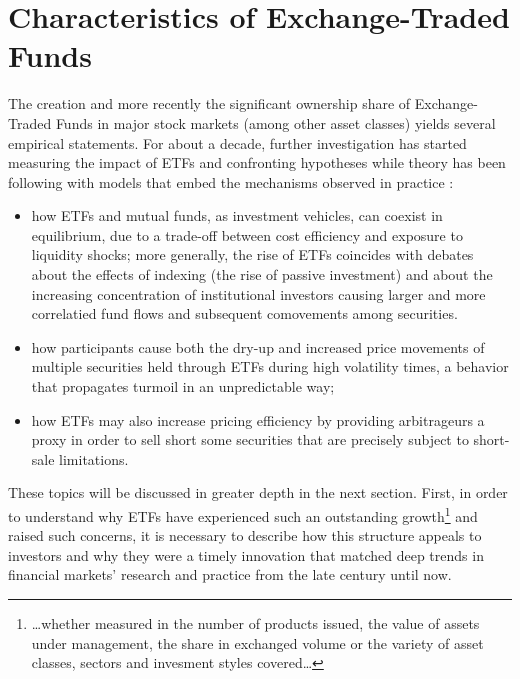 \section{Characteristics of Exchange-Traded Funds}
The creation and more recently the significant ownership share of Exchange-Traded Funds in major stock markets (among other asset classes) yields several empirical statements. For about a decade, further investigation has started measuring the impact of ETFs and confronting hypotheses while theory has been following with models that embed the mechanisms observed in practice :
\begin{itemize}
  \item how ETFs and mutual funds, as investment vehicles, can coexist in equilibrium, due to a trade-off between cost efficiency and exposure to liquidity shocks; more generally, the rise of ETFs coincides with debates about the effects of indexing (the rise of passive investment) and about the increasing concentration of institutional investors causing larger and more correlatied fund flows and subsequent comovements among securities.
\item how participants cause both the dry-up and increased price movements of multiple securities held through ETFs during high volatility times, a behavior that propagates turmoil in an unpredictable way;
  \item how ETFs may also increase pricing efficiency by providing arbitrageurs a proxy in order to sell short some securities that are precisely subject to short-sale limitations.
  \end{itemize}

These topics will be discussed in greater depth in the next section. First, in order to understand why ETFs have experienced such an outstanding growth\footnote{\dots whether measured in the number of products issued, the value of assets under management, the share in exchanged volume or the variety of asset classes, sectors and invesment styles covered\dots} and raised such concerns, it is necessary to describe how this structure appeals to investors and why they were a timely innovation that matched deep trends in financial markets' research and practice from the late  century until now.
